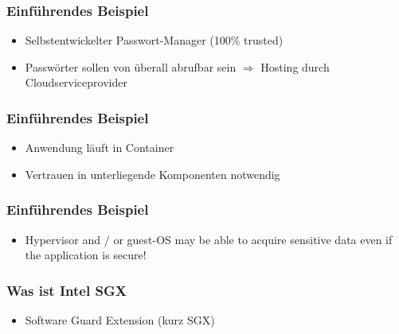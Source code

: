 \begin{frame}
    \frametitle{Einführendes Beispiel}
    \begin{itemize}
        \item Selbstentwickelter Passwort-Manager (100\% trusted)
        \item Passwörter sollen von überall abrufbar sein $\Rightarrow$ Hosting durch Cloudserviceprovider
    \end{itemize}
    \centering
\end{frame}

\begin{frame}
    \frametitle{Einführendes Beispiel}
    \begin{itemize}
        \item Anwendung läuft in Container
        \item Vertrauen in unterliegende Komponenten notwendig
    \end{itemize}
    \centering
\end{frame}

\begin{frame}
    \frametitle{Einführendes Beispiel}
    \begin{itemize}
        \item Hypervisor and / or guest-OS may be able to acquire sensitive data even if the application is secure!
    \end{itemize}
    \centering
\end{frame}

\begin{frame}
    \frametitle{Was ist Intel SGX}
    \begin{itemize}
        \item Software Guard Extension (kurz SGX)
    \end{itemize}
\end{frame}